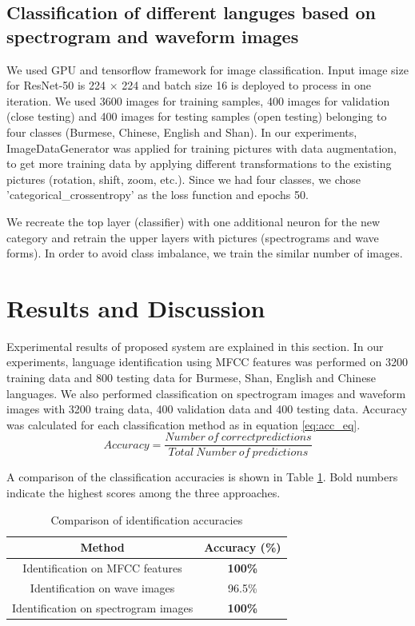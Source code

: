 \documentclass[conference]{IEEEtran}
\begin{document}
\subsection{Classification of different languges based on spectrogram and waveform images}
We used GPU and tensorflow framework for image classification. Input image size for ResNet-50 is 224 $\times$ 224 and batch size 16 is deployed to process in one iteration. We used 3600 images for training samples, 400 images for validation (close testing) and 400 images for testing samples (open testing) belonging to four classes (Burmese, Chinese, English and Shan). In our experiments, ImageDataGenerator was applied for training pictures with data augmentation, to get more training data by applying different transformations to the existing pictures (rotation, shift, zoom, etc.). Since we had four classes, we chose 'categorical\_crossentropy' as the loss function and epochs 50. 
	
We recreate the top layer (classifier) with one additional neuron for the new category and retrain the upper layers with pictures (spectrograms and wave forms). In order to avoid class imbalance, we train the similar number of images.

\section{Results and Discussion}\label{Sec:ResultDiscussion}
Experimental results of proposed system are explained in this section. In our experiments, language identification using MFCC features was performed on 3200 training data and 800 testing data for Burmese, Shan, English and Chinese languages. We also performed classification on spectrogram images and waveform images with 3200 traing data, 400 validation data and 400 testing data. Accuracy was calculated for each classification method as in equation \ref{eq:acc_eq}.
\begin{equation}
Accuracy = \frac{Number\: of\: correct predictions}{Total\: Number\: of\: predictions}\label{eq:acc_eq}
\end{equation}

A comparison of the classification accuracies is shown in Table \ref{table:acc_tb}. Bold numbers indicate the highest scores among the three approaches. 
\begin{table}[htbp]
\caption{Comparison of identification accuracies}
\begin{center}
\begin{tabular}{|c|c|}
\hline
\bf{Method}&\bf{Accuracy (\%) } \\
\hline
Identification on MFCC features&\textbf{100\% } \\
\hline
Identification on wave images&96.5\%  \\
\hline
Identification on spectrogram images&\textbf{100\% }\\
\hline
\end{tabular}
\label{table:acc_tb}
\end{center}
\end{table}
\end{document}

